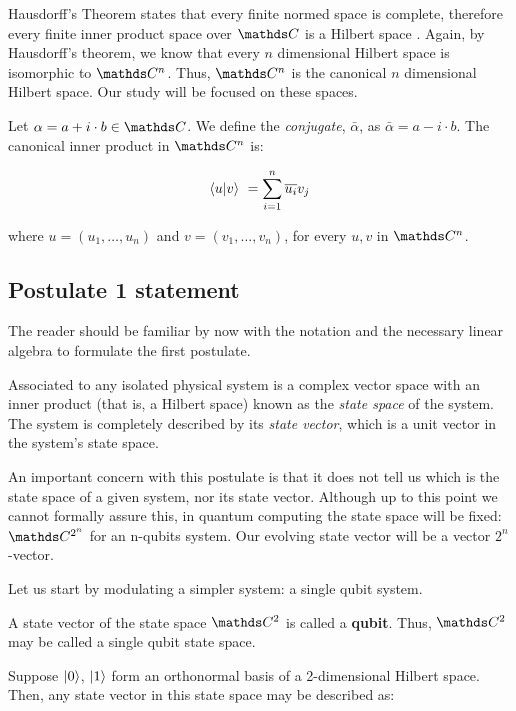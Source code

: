 Hausdorff's Theorem states that every finite normed space is complete, therefore every finite inner product space over $\C$ is a Hilbert space \cite{Paya2020}. Again, by Hausdorff's theorem, we know that every $n$ dimensional Hilbert space is isomorphic to $\C^n$. Thus, $\C^n$ is the canonical $n$ dimensional Hilbert space. Our study will be focused on these spaces.

Let $\alpha = a + i \cdot b\in \C$. We define the \emph{conjugate}, $\bar \alpha$, as $\bar \alpha = a - i \cdot b$. The canonical inner product in $\C^n$ is:

$$ \langle u|v \rangle \ = \sum_{i=1}^n \overline{u_i}v_j $$

where $u = (u_1, \dotsc, u_n)$ and $v = (v_1, \dotsc, v_n)$, for every $u,v$ in $\C^n$.


\subsection{Postulate 1 statement}


The reader should be familiar by now with the notation and the necessary linear algebra to formulate the first postulate.

\begin{postulate}
	Associated to any isolated physical system is a complex vector space with an inner product (that is, a Hilbert space) known as the \emph{state space} of the system. The system is completely described by its \emph{state vector}, which is a unit vector in the system’s state space.
\end{postulate}

An important concern with this postulate is that it does not tell us which is the state space of a given system, nor its state vector. Although up to this point we cannot formally assure this, in quantum computing the state space will be fixed: $\C^{2^n}$ for an n-qubits system. Our evolving state vector will be a vector $2^n$-vector.

Let us start by modulating a simpler system: a single qubit system.

\begin{definition}
	A state vector of the state space $\C^{2}$ is called a \textbf{qubit}. Thus, $\C^{2}$ may be called a single qubit state space.
\end{definition}

Suppose $|0\rangle$, $|1\rangle$ form an orthonormal basis of a 2-dimensional Hilbert space. Then, any state vector in this state space may be described as:

